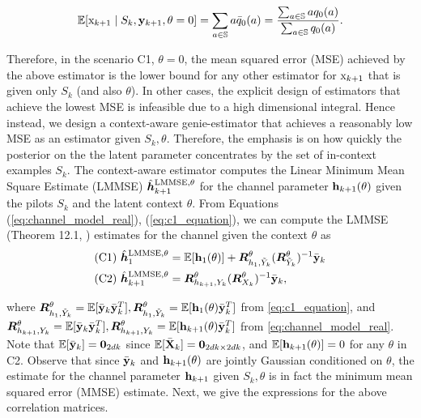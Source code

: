 \documentclass[journal,letterpaper,onecolumn]{IEEEtran}
\begin{document}
\begin{equation}
    \label{eq:one_ray_model_symbol_estimation}
    \mathbb{E}[{\textnormal{x}}_{k+1} \mid S_k, {\mathbf{y}}_{k+1}, \theta = 0] = \sum_{a\in{\mathbb{S}}}a\bar{q}_0(a) = \frac{\sum_{a\in{\mathbb{S}}} a q_0(a)}{\sum_{a \in {\mathbb{S}}} q_0(a)}.
\end{equation}

Therefore, in the scenario C1, $\theta= 0$, the mean squared error (MSE) achieved by the above estimator is the lower bound for any other estimator for ${\textnormal{x}}_{k+1}$ that is given only $S_k$ (and also $\theta$). In other cases, the explicit design of estimators that achieve the lowest MSE is infeasible due to a high dimensional integral. Hence instead, we design a context-aware genie-estimator that achieves a reasonably low MSE as an estimator given $S_k, \theta$. Therefore, the emphasis is on how quickly the posterior on the the latent parameter concentrates by the set of in-context examples $S_k$.
The context-aware estimator computes the Linear Minimum Mean Square Estimate (LMMSE) $\hat{{\bm{h}}}_{k+1}^{\rm LMMSE, \theta}$ for the channel parameter ${\mathbf{h}}_{k+1}(\theta)$ given the pilots $S_k$ and the latent context $\theta$. From Equations (\ref{eq:channel_model_real}), (\ref{eq:c1_equation}), we can compute the LMMSE (Theorem 12.1, \cite{Kay97}) estimates for the channel given the context $\theta$ as
\begin{align}
\label{eq:LMMSE_channel_estimate_C1}
    ({\rm C1})~\hat{{\bm{h}}}_{1}^{\rm LMMSE, \theta} &= \mathbb{E}[{\mathbf{h}}_1(\theta)] + {\bm{R}}_{h_{1}, \tilde{Y}_k}^\theta ({\bm{R}}_{\tilde{Y}_k}^\theta)^{-1} \bar{{\mathbf{y}}}_{k} \\
    \label{eq:LMMSE_channel_estimate_C2}
    ({\rm C2})~\hat{{\bm{h}}}_{k+1}^{\rm LMMSE, \theta}  &= {\bm{R}}_{h_{k+1}, Y_k}^\theta ({\bm{R}}_{X_k}^\theta)^{-1} \bar{{\mathbf{y}}}_{k},
\end{align}

where ${\bm{R}}^\theta_{h_1, \tilde{Y}_k} = \mathbb{E}[\bar{{\mathbf{y}}}_{k}\bar{{\mathbf{y}}}_k^T], {\bm{R}}^\theta_{h_1, \tilde{Y}_k} = \mathbb{E}[{\mathbf{h}}_1(\theta) \bar{{\mathbf{y}}}_{k}^T]$ from \ref{eq:c1_equation}, and ${\bm{R}}^\theta_{h_{k+1}, {Y}_k} = \mathbb{E}[\bar{{\mathbf{y}}}_{k}\bar{{\mathbf{y}}}_k^T], {\bm{R}}^\theta_{h_{k+1}, {Y}_k} = \mathbb{E}[{\mathbf{h}}_{k+1}(\theta) \bar{{\mathbf{y}}}_{k}^T]$ from \ref{eq:channel_model_real}. Note that $\mathbb{E}[\bar{{\mathbf{y}}}_{k}] = \mathbf{0}_{2dk}$ since $\mathbb{E}[\bar{{\mathbf{X}}}_k] = \mathbf{0}_{2dk\times 2dk}$, and $\mathbb{E}[{\mathbf{h}}_{k+1}(\theta)] = 0$ for any $\theta$ in C2.
Observe that since $\bar{{\mathbf{y}}}_k$ and ${{\mathbf{h}}}_{k+1}(\theta)$ are jointly Gaussian conditioned on $\theta$, the estimate for the channel parameter ${\mathbf{h}}_{k+1}$ given $S_k,\theta$ is in fact the minimum mean squared error (MMSE) estimate. Next, we give the expressions for the above correlation matrices.
\end{document}
